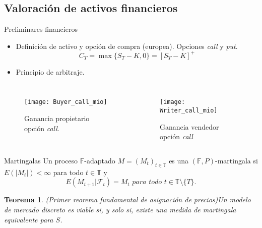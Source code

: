 \documentclass[9pt]{beamer}
\newtheorem{teorema}{Teorema}
\begin{document}
	\subsection{Valoración de activos financieros}
	\begin{frame}{Preliminares financieros}
		\begin{itemize}
			 \item Definición de activo y opción de compra (europea). Opciones \textit{call} y \textit{put}.
			 \[
			 C_T = \max\{S_T-K, 0\} = \left[S_T - K\right]^+
			 \] 
			 \item Principio de arbitraje.
		\end{itemize}
		\begin{columns}
			\begin{figure}[h!]
				\texttt{[image: Buyer\_call\_mio]}
				\caption{Ganancia propietario opción \textit{call}.}
			\end{figure}
			\begin{figure}[h!]
				\texttt{[image: Writer\_call\_mio]}
				\caption{Ganancia vendedor opción \textit{call}}
			\end{figure} 
		\end{columns}
	
	\end{frame}

	\begin{frame}{Martingalas}
		Un proceso $ \mathbb{F} $-adaptado $ M = (M_t)_{t\in \mathbb{T}} $ es una $ ( \mathbb{F},P)$-mar\-tingala si $ E(|M_t|) < \infty $ para todo $ t \in \mathbb{T} $ y 
		\[
		E(M_{t+1}|\mathcal{F}_t) = M_t \textit{ para todo } t \in \mathbb{T}\setminus\{T\}.
		\]
		\begin{teorema}(Primer reorema fundamental de asignación de precios)\label{VIABLEiofEMM}
			Un modelo de mercado discreto es viable si, y solo si, existe una medida de martingala equivalente para $ S $.
		\end{teorema}
	\end{frame}
\end{document}
